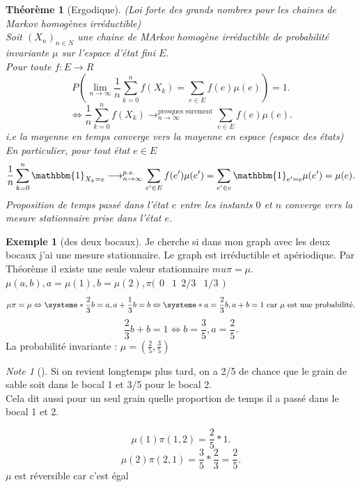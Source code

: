 \documentclass{article}
\theoremstyle{plain}%
\newtheorem{thm}{Théorème}[section]
\theoremstyle{definition}
\newtheorem{exmp}{Exemple}[section]
\theoremstyle{remark}
\newtheorem*{note}{Note}
\begin{document}
\begin{thm}[Ergodique]
	(Loi forte des grands nombres pour les chaines de Markov homogènes irréductible) \\ 
	Soit $ (X_n)_{n \in N} $ une chaine de MArkov homogène irréductible de probabilité invariante $ \mu  $ sur l'espace d'état fini $ E $. \\ 
	Pour toute $ f:E \rightarrow R $ 
	\[
		P(\lim_{n \to \infty} \frac{1}{n} \sum_{k=0}^{n} f(X_k) = \sum_{e \in E}^{}f(e)\mu (e)) = 1
	.\]
	\[
		\Leftrightarrow \frac{1}{n}\sum_{k=0}^{n}f(X_k) \longrightarrow ^\text{presques surement}_{n \to \infty } \sum_{e \in E}^{}f(e)\mu (e)
	.\]
	i.e la moyenne en temps converge vers la moyenne en espace (espace des états) \\
	En particulier, pour tout état $ e \in E $ 
	\[
		\frac{1}{n}\sum_{k=0}^{n}\mathbbm{1}_{X_k=e} \longrightarrow _{n \to \infty }^{p.s.} \sum_{e' \in E}^{}f(e')\mu (e') = \sum_{e' \in e}^{}\mathbbm{1}_{e' = e}\mu (e') = \mu (e)
	.\]
	Proposition de temps passé dans l'état $ e $ entre les instants $ 0 $ et $ n $ converge vers la mesure stationnaire prise dans l'état $ e $.
\end{thm}
\begin{exmp}[des deux bocaux]
	Je cherche si dans mon graph avec les deux bocaux j'ai une mesure stationnaire. Le graph est irréductible et apériodique. Par Théorème il existe une seule valeur stationnaire $ mu \pi = \mu $. \\
	$ \mu (a,b) , a=\mu (1), b=\mu (2), \pi \big(\begin{smallmatrix}
		0 & 1 \ \
		2/3 & 1/3
	\end{smallmatrix}\big)$  
	\[
		\mu \pi = \mu \Leftrightarrow \systeme*{
			\frac{2}{3}b=a, 
			a + \frac{1}{3}b = b
		} \Leftrightarrow \systeme*{
			a= \frac{2}{3}b, 
			a+b = 1 \text{ car } \mu \text{ est une probabilité}
		}		
	.\]
	\[
		\frac{2}{3}b + b = 1 \Leftrightarrow b=\frac{3}{5}, a=\frac{2}{5}
	.\]
	La probabilité invariante : $ \mu = (\frac{2}{5}, \frac{3}{5}) $ \\
	\begin{note}[]
		Si on revient longtemps plus tard, on a 2/5 de chance que le grain de sable soit dans le bocal 1 et 3/5 pour le bocal 2. \\
		Cela dit aussi pour un seul grain quelle proportion de temps il a passé dans le bocal 1 et 2.
	\end{note}
	\[
		\mu (1) \pi (1,2) = \frac{2}{5} * 1
	.\]
	\[
		\mu (2) \pi (2,1) = \frac{3}{5} * \frac{2}{3} = \frac{2}{5}
	.\]
	$ \mu  $ est réversible car c'est égal	
\end{exmp}
\end{document}
